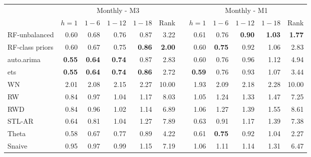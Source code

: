 \documentclass[11pt,a4paper,]{article}
\theoremstyle{definition}
\theoremstyle{definition}
\theoremstyle{definition}
\theoremstyle{remark}
\begin{document}
\begin{table}[!htbp]
\begin{tabular}{lrrrrrrrrrrr}
           &                                   \multicolumn{ 5}{c}{Monthly - M3} &            &                                   \multicolumn{ 5}{c}{Monthly - M1} \\
                     &    $h=1$ &    $1-6$   &     $1-12$ &    $1-18$  &   Rank     &            &   $h=1$  &    $1-6$   &    $1-12$  &    $1-18$  &   Rank \\\cmidrule(lr){2-6} \cmidrule(lr){8-12}
RF-unbalanced        &       0.60 &       0.68 &       0.76 &       0.87 &       3.22 &            &       0.61 &       0.76 & {\bf 0.90} & {\bf 1.03} &       {\bf 1.77} \\
RF-class priors      &       0.60 &       0.67 & 0.75 & {\bf 0.86} &       {\bf 2.00} &            &       0.60 &       {\bf 0.75} &       0.92 &       1.06 &        2.83 \\
auto.arima           &      {\bf 0.55 }&      {\bf 0.64} &      {\bf 0.74} &       0.87 &       2.83 &            &       0.60 &       0.76 &       0.96 &       1.12 &       4.94 \\
ets                  & {\bf 0.55} & {\bf 0.64} & {\bf 0.74} &       {\bf 0.86} & 2.72 &            &      {\bf 0.59} &       0.76 &       0.93 &       1.07 &       3.44 \\
WN                   &       2.01 &       2.08 &       2.15 &       2.27 &      10.00 &            &       1.93 &       2.09 &       2.18 &       2.28 &      10.00 \\
RW                   &       0.84 &       0.97 &       1.04 &       1.17 &    8.03 &            &       1.05 &       1.24 &       1.33 &       1.47 &      7.25 \\
RWD                  &       0.84 &       0.96 &       1.02 &       1.14 &       6.89 &            &       1.06 &       1.27 &       1.39 &       1.55 &      8.61 \\
STL-AR               &       0.64 &       0.81 &       1.04 &       1.27 &       7.89 &            &       0.63 &       0.91 &       1.17 &       1.39 &       7.38 \\
Theta                &       0.58 &       0.67 &       0.77 &       0.89 &       4.22 &            & 0.61 & {\bf 0.75} &       0.92 &       1.04 & 2.27 \\
Snaive               &       0.95 &       0.97 &       0.99 &       1.15 &       7.19 &            &       1.06 &       1.11 &       1.14 &       1.31 &       6.47 \\
\bottomrule
\end{tabular}
\end{table}
\end{document}
